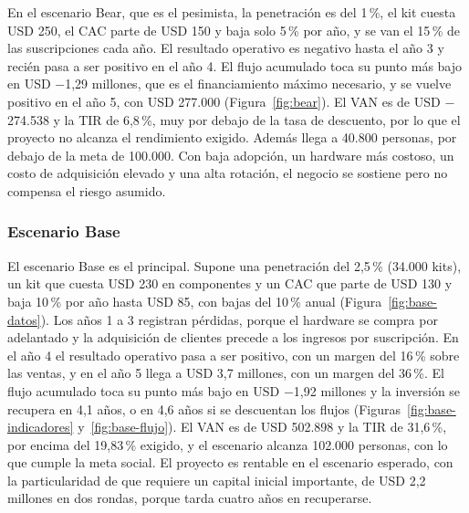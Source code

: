 En el escenario Bear, que es el pesimista, la penetración es del 1\,\%, el kit cuesta USD 250, el CAC parte de USD 150 y baja solo 5\,\% por año, y se van el 15\,\% de las suscripciones cada año.
El resultado operativo es negativo hasta el año 3 y recién pasa a ser positivo en el año 4.
El flujo acumulado toca su punto más bajo en USD $-$1,29 millones, que es el financiamiento máximo necesario, y se vuelve positivo en el año 5, con USD 277.000 (Figura~\ref{fig:bear}).
El VAN es de USD $-$274.538 y la TIR de 6,8\,\%, muy por debajo de la tasa de descuento, por lo que el proyecto no alcanza el rendimiento exigido.
Además llega a 40.800 personas, por debajo de la meta de 100.000.
Con baja adopción, un hardware más costoso, un costo de adquisición elevado y una alta rotación, el negocio se sostiene pero no compensa el riesgo asumido.


\FloatBarrier
\subsubsection{Escenario Base}

El escenario Base es el principal.
Supone una penetración del 2,5\,\% (34.000 kits), un kit que cuesta USD 230 en componentes y un CAC que parte de USD 130 y baja 10\,\% por año hasta USD 85, con bajas del 10\,\% anual (Figura~\ref{fig:base-datos}).
Los años 1 a 3 registran pérdidas, porque el hardware se compra por adelantado y la adquisición de clientes precede a los ingresos por suscripción.
En el año 4 el resultado operativo pasa a ser positivo, con un margen del 16\,\% sobre las ventas, y en el año 5 llega a USD 3,7 millones, con un margen del 36\,\%.
El flujo acumulado toca su punto más bajo en USD $-$1,92 millones y la inversión se recupera en 4,1 años, o en 4,6 años si se descuentan los flujos (Figuras~\ref{fig:base-indicadores} y~\ref{fig:base-flujo}).
El VAN es de USD 502.898 y la TIR de 31,6\,\%, por encima del 19,83\,\% exigido, y el escenario alcanza 102.000 personas, con lo que cumple la meta social.
El proyecto es rentable en el escenario esperado, con la particularidad de que requiere un capital inicial importante, de USD 2,2 millones en dos rondas, porque tarda cuatro años en recuperarse.


